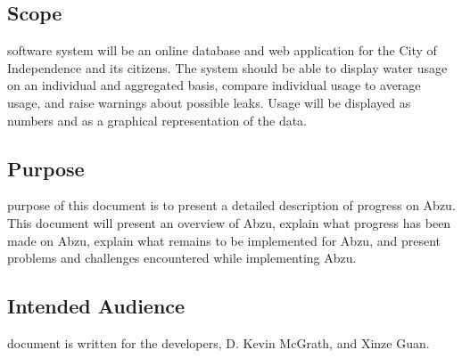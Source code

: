 \documentclass[journal]{IEEEtran}
\begin{document}
 

\subsection{Scope}
 software system will be an online database and web application for the City of Independence and its citizens. The system should be able to display water usage on an individual and aggregated basis, compare individual usage to average usage, and raise warnings about possible leaks. Usage will be displayed as numbers and as a graphical representation of the data. 

\subsection{Purpose}
 purpose of this document is to present a detailed description of progress on Abzu. This document will present an overview of Abzu, explain what progress has been made on Abzu, explain what remains to be implemented for Abzu, and present problems and challenges encountered while implementing Abzu.

\subsection{Intended Audience}

 document is written for the developers, D. Kevin McGrath, and Xinze Guan. 







%
%
\end{document}
